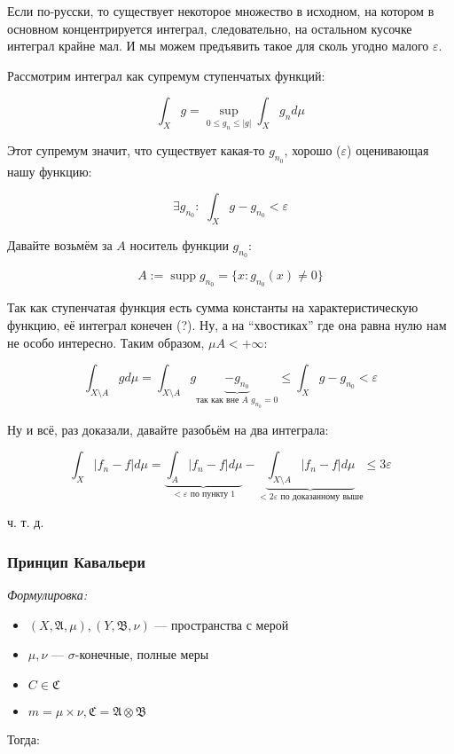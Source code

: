 \documentclass{article}
\def\dbl{\,\,}
\DeclareMathOperator{\supp}{supp}
\begin{document}
Если по-русски, то существует некоторое множество в исходном, на котором в основном концентрируется интеграл, следовательно, на остальном кусочке интеграл крайне мал. И мы можем предъявить такое для сколь угодно малого $\varepsilon$.

Рассмотрим интеграл как супремум ступенчатых функций:

\[\int_{X} g = \sup_{0 \le g_n \le |g|} \int_{X} g_n d\mu\]

Этот супремум значит, что существует какая-то $g_{n_0}$, хорошо ($\varepsilon$) оценивающая нашу функцию:

\[\exists g_{n_0}: \dbl \int_{X} g - g_{n_0} < \varepsilon\]

Давайте возьмём за $A$ носитель функции $g_{n_0}$:

\[A := \supp g_{n_0} = \{x: g_{n_0}(x) \neq 0\}\]

Так как ступенчатая функция есть сумма константы на характеристическую функцию, её интеграл конечен (?). Ну, а на ``хвостиках'' где она равна нулю нам не особо интересно. Таким образом, $\mu A < + \infty$:

\[\int_{X \setminus A} g d\mu = \int_{X \setminus A} g \underbrace{- g_{n_0}}_{\text{так как вне } A \,\, g_{n_0} = 0} \le \int_{X} g - g_{n_0} < \varepsilon\]

Ну и всё, раз доказали, давайте разобьём на два интеграла:

\[\int_{X} |f_n - f| d\mu = \underbrace{\int_{A} |f_n - f| d\mu}_{< \varepsilon \text{ по пункту 1}} - \underbrace{\int_{X \setminus A} |f_n - f| d\mu}_{<2 \varepsilon \text{ по доказанному выше}} \le 3 \varepsilon\]

ч. т. д. 

\subsubsection{Принцип Кавальери}
\textit{Формулировка:}

\begin{itemize}
    \item $(X, \mathfrak{A}, \mu), (Y, \mathfrak{B}, \nu)$ --- пространства с мерой
    \item $\mu, \nu$ --- $\sigma$-конечные, полные меры
    \item $C \in \mathfrak{C}$
    \item $m = \mu \times \nu, \mathfrak{C} = \mathfrak{A} \otimes \mathfrak{B}$
\end{itemize}

Тогда: 
\end{document}
